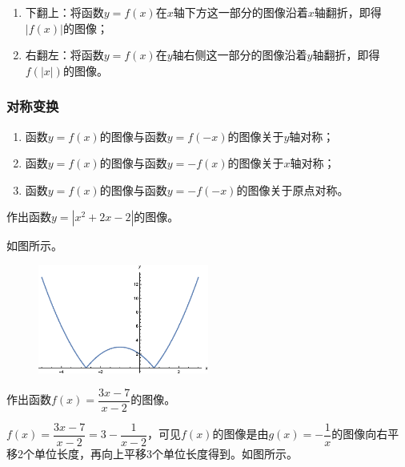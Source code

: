 \documentclass[lang=cn,math=cm,chinesefont=nofont,11pt,scheme=chinese,onecol]{elegantbook}
\begin{document}
\begin{enumerate}
  \item 下翻上：将函数$y=f(x)$在$x$轴下方这一部分的图像沿着$x$轴翻折，即得$\left| f(x)\right|$的图像；
  \item 右翻左：将函数$y=f(x)$在$y$轴右侧这一部分的图像沿着$y$轴翻折，即得$f(\left| x\right|)$的图像。
\end{enumerate}

\subsubsection{对称变换}

\begin{enumerate}
  \item 函数$y=f(x)$的图像与函数$y=f(-x)$的图像关于$y$轴对称；
  \item 函数$y=f(x)$的图像与函数$y=-f(x)$的图像关于$x$轴对称；
  \item 函数$y=f(x)$的图像与函数$y=-f(-x)$的图像关于原点对称。
\end{enumerate}

\begin{example}
  作出函数$y=\left| x^2+2x-2\right|$的图像。
\end{example}

\begin{solution}
  如图所示。
\end{solution}

\begin{figure}[h]
  \centering
  \includegraphics[width=0.5\textwidth]{image/2.1.5function3.eps}
  \label{img:2.1.5function3}
\end{figure}

\begin{example}
  作出函数$f(x)=\dfrac{3x-7}{x-2}$的图像。
\end{example}

\begin{spacing}{1.8}
  
\end{spacing}
\begin{solution}
  \begin{spacing}{1.8}
    $f(x)=\dfrac{3x-7}{x-2}=3-\dfrac{1}{x-2}$，可见$f(x)$的图像是由$g(x)=-\dfrac{1}{x}$的图像向右平移2个单位长度，再向上平移$3$个单位长度得到。如图所示。
  \end{spacing}
\end{solution}
\end{document}
